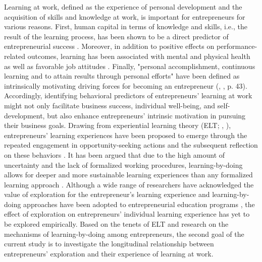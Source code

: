 \documentclass[man, 12pt, a4paper, noextraspace]{apa6}
\begin{document}
Learning at work, defined as the experience of personal development and the acquisition of skills and knowledge at work, is important for entrepreneurs for various reasons.
First, human capital in terms of knowledge and skills, i.e., the result of the learning process, has been shown to be a direct predictor of entrepreneurial success \parencite{Unger.2011}.
Moreover, in addition to positive effects on performance-related outcomes, learning has been associated with mental and physical health as well as favorable job attitudes \parencite{Kleine.2019}.  
Finally, "personal accomplishment, continuous learning and to attain results through personal efforts" have been defined as intrinsically motivating driving forces for becoming an entrepreneur (\citeauthor{Jayawarna2013}, \citeyear{Jayawarna2013}, p. 43). 
Accordingly, identifying behavioral predictors of entrepreneurs' learning at work might not only facilitate business success, individual well-being, and self-development, but also enhance entrepreneurs' intrinsic motivation in pursuing their business goals. 
Drawing from experiential learning theory (ELT; \citeauthor{Kolb2009}, \citeyear{Kolb2009}), entrepreneurs' learning experiences have been proposed to emerge through the repeated engagement in opportunity-seeking actions and the subsequent reflection on these behaviors \parencite{Holcomb2009}. 
It has been argued that due to the high amount of uncertainty and the lack of formalized working procedures, learning-by-doing allows for deeper and more sustainable learning experiences than any formalized learning approach \parencite[e.g.,][]{Minniti.2001, Cope.2000, Chang2014}. 
Although a wide range of researchers have acknowledged the value of exploration for the entrepreneur's learning experience and learning-by-doing approaches have been adopted to entrepreneurial education programs \parencite[e.g.,][]{Chang2014, Pittaway2011, Daly2001}, the effect of exploration on entrepreneurs' individual learning experience has yet to be explored empirically. 
Based on the tenets of ELT and research on the mechanisms of learning-by-doing among entrepreneurs, the second goal of the current study is to investigate the longitudinal relationship between entrepreneurs' exploration and their experience of learning at work. \par 
\end{document}
